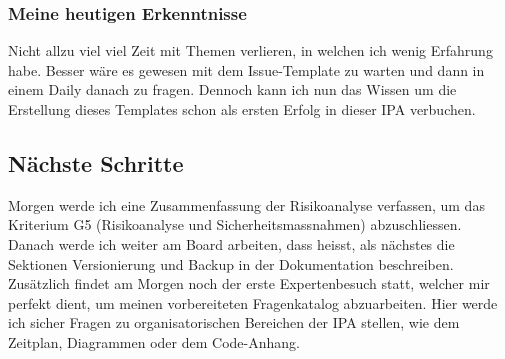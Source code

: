 \subsubsection*{Meine heutigen Erkenntnisse}
Nicht allzu viel viel Zeit mit Themen verlieren, in welchen ich wenig Erfahrung habe. Besser wäre es gewesen mit dem Issue-Template zu warten
und dann in einem Daily danach zu fragen. Dennoch kann ich nun das Wissen um die Erstellung dieses Templates schon als ersten Erfolg in
dieser IPA verbuchen.

\subsection*{Nächste Schritte}
Morgen werde ich eine Zusammenfassung der Risikoanalyse verfassen, um das Kriterium G5 (Risikoanalyse und Sicherheitsmassnahmen) abzuschliessen.
Danach werde ich weiter am Board arbeiten, dass heisst, als nächstes die Sektionen Versionierung und Backup in der Dokumentation beschreiben.
Zusätzlich findet am Morgen noch der erste Expertenbesuch statt, welcher mir perfekt dient, um meinen vorbereiteten Fragenkatalog abzuarbeiten. 
Hier werde ich sicher Fragen zu organisatorischen Bereichen der IPA stellen, wie dem Zeitplan, Diagrammen oder dem Code-Anhang.

\pagebreak
